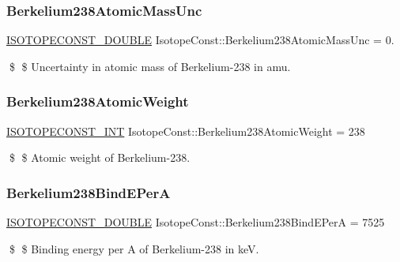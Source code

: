 \subsubsection{\texorpdfstring{Berkelium238\+Atomic\+Mass\+Unc}{Berkelium238AtomicMassUnc}}
{\footnotesize\ttfamily \mbox{\hyperlink{group___isotope_const-_macros_ga8f45a7272ce02c0b4c65c44636ed719a}{I\+S\+O\+T\+O\+P\+E\+C\+O\+N\+S\+T\+\_\+\+D\+O\+U\+B\+LE}} Isotope\+Const\+::\+Berkelium238\+Atomic\+Mass\+Unc = 0.}

\$ \$ Uncertainty in atomic mass of Berkelium-\/238 in amu. \mbox{\label{group___isotope_const-_berkelium-_bk238_ga582a7539d821139f55c590b0110b5d8a}} 
\subsubsection{\texorpdfstring{Berkelium238\+Atomic\+Weight}{Berkelium238AtomicWeight}}
{\footnotesize\ttfamily \mbox{\hyperlink{group___isotope_const-_macros_ga5f18360b3e99483a35c32d789e62621c}{I\+S\+O\+T\+O\+P\+E\+C\+O\+N\+S\+T\+\_\+\+I\+NT}} Isotope\+Const\+::\+Berkelium238\+Atomic\+Weight = 238}

\$ \$ Atomic weight of Berkelium-\/238. \mbox{\label{group___isotope_const-_berkelium-_bk238_gaf0b179b74a7260e37af932611b695c36}} 
\subsubsection{\texorpdfstring{Berkelium238\+Bind\+E\+PerA}{Berkelium238BindEPerA}}
{\footnotesize\ttfamily \mbox{\hyperlink{group___isotope_const-_macros_ga8f45a7272ce02c0b4c65c44636ed719a}{I\+S\+O\+T\+O\+P\+E\+C\+O\+N\+S\+T\+\_\+\+D\+O\+U\+B\+LE}} Isotope\+Const\+::\+Berkelium238\+Bind\+E\+PerA = 7525}

\$ \$ Binding energy per A of Berkelium-\/238 in keV. \mbox{\label{group___isotope_const-_berkelium-_bk238_gae759674c70768ba2efe4918cda2df675}} 
